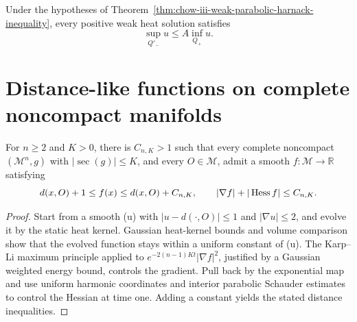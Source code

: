 \begin{theorem}
\label{thm:chow-iii-weak-solution-parabolic-harnack-estimate}


Under the hypotheses of Theorem~\ref{thm:chow-iii-weak-parabolic-harnack-inequality},
every positive weak heat solution satisfies
\[
 \sup_{Q'_-}u\le A\inf_{Q_+}u.
\]
\end{theorem}

\section{Distance-like functions on complete noncompact manifolds}

\begin{proposition}
\label{prop:chow-iii-distance-like-function-bounded-derivatives}


For \(n\ge2\) and \(K>0\), there is \(C_{n,K}>1\) such that every complete
noncompact \((\mathcal M^n,g)\) with \( |\sec(g)|\le K\), and every
\(O\in\mathcal M\), admit a smooth \(f:\mathcal M\to\mathbb R\) satisfying
\[
 d(x,O)+1\le f(x)\le d(x,O)+C_{n,K},
 \qquad |\nabla f|+|\operatorname{Hess} f|\le C_{n,K}.
\]
\end{proposition}
\begin{proof}
\sketch Start from a smooth (u) with \(|u-d(\cdot,O)|\le1\) and
\(|\nabla u|\le2\), and evolve it by the static heat kernel.  Gaussian
heat-kernel bounds and volume comparison show that the evolved function stays
within a uniform constant of (u).  The Karp--Li maximum principle applied
to \(e^{-2(n-1)Kt}|\nabla f|^2\), justified by a Gaussian weighted energy
bound, controls the gradient.  Pull back by the exponential map and use
uniform harmonic coordinates and interior parabolic Schauder estimates to
control the Hessian at time one.  Adding a constant yields the stated
distance inequalities.
\end{proof}

